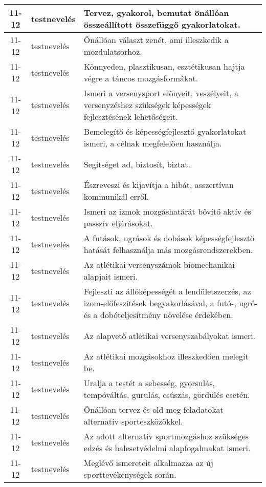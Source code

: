 \begin{small}
\begin{longtable}{c | p{2cm} |  p{11cm} }
              11-12 & testnevelés & Tervez, gyakorol, bemutat önállóan összeállított összefüggő gyakorlatokat. \\ \hline
              11-12 & testnevelés & Önállóan választ zenét, ami illeszkedik a mozdulatsorhoz. \\ \hline
              11-12 & testnevelés & Könnyeden, plasztikusan, esztétikusan hajtja végre a táncos mozgásformákat. \\ \hline
              11-12 & testnevelés & Ismeri a versenysport előnyeit, veszélyeit, a versenyzéshez szükségek képességek fejlesztésének lehetőségeit. \\ \hline
              11-12 & testnevelés & Bemelegítő és képességfejlesztő gyakorlatokat ismeri, a célnak megfelelően használja. \\ \hline
              11-12 & testnevelés & Segítséget ad, biztosít, biztat. \\ \hline
              11-12 & testnevelés & Észreveszi és kijavítja a hibát, asszertívan kommunikál erről. \\ \hline
              11-12 & testnevelés & Ismeri az izmok mozgáshatárát bővítő aktív és passzív eljárásokat. \\ \hline
              11-12 & testnevelés & A futások, ugrások és dobások képességfejlesztő hatását felhasználja más mozgásrendszerekben. \\ \hline
              11-12 & testnevelés & Az atlétikai versenyszámok biomechanikai alapjait ismeri. \\ \hline
              11-12 & testnevelés & Fejleszti az állóképességét a lendületszerzés, az izom-előfeszítések begyakorlásával, a futó-, ugró- és a dobóteljesítmény növelése érdekében. \\ \hline
              11-12 & testnevelés & Az alapvető atlétikai versenyszabályokat ismeri. \\ \hline
              11-12 & testnevelés & Az atlétikai mozgásokhoz illeszkedően melegít be. \\ \hline
              11-12 & testnevelés & Uralja a testét a sebesség, gyorsulás, tempóváltás, gurulás, csúszás, gördülés esetén. \\ \hline
              11-12 & testnevelés & Önállóan tervez  és old meg feladatokat alternatív sporteszközökkel. \\ \hline
              11-12 & testnevelés & Az adott alternatív sportmozgáshoz szükséges edzés és balesetvédelmi alapfogalmakat ismeri. \\ \hline
              11-12 & testnevelés & Meglévő ismereteit alkalmazza az új sporttevékenységek során. \\ \hline

\end{longtable}
\end{small}
